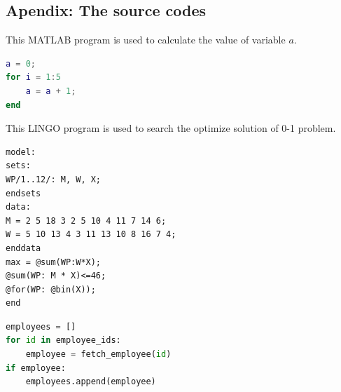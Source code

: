 \documentclass[12pt]{article}
\begin{document}
\clearpage
\begin{subappendices}						%
\section*{Apendix: The source codes}		%

This MATLAB program is used to calculate the value of variable $a$.
\begin{lstlisting}[language=Matlab, caption=\texttt{temp.m}]
a = 0;
for i = 1:5
	a = a + 1;
end
\end{lstlisting}

This LINGO program is used to search the optimize solution of 0-1 problem.
\begin{lstlisting}[language=Lingo, caption=\texttt{temp.lg4}]
model:
sets:
WP/1..12/: M, W, X;
endsets
data:
M = 2 5 18 3 2 5 10 4 11 7 14 6;
W = 5 10 13 4 3 11 13 10 8 16 7 4;
enddata
max = @sum(WP:W*X);
@sum(WP: M * X)<=46;
@for(WP: @bin(X));
end
\end{lstlisting}

\begin{lstlisting}[language=Python, caption=\texttt{temp.py}]
employees = []
for id in employee_ids:
	employee = fetch_employee(id)
if employee:
	employees.append(employee)
\end{lstlisting}

\end{subappendices}

\end{document}
